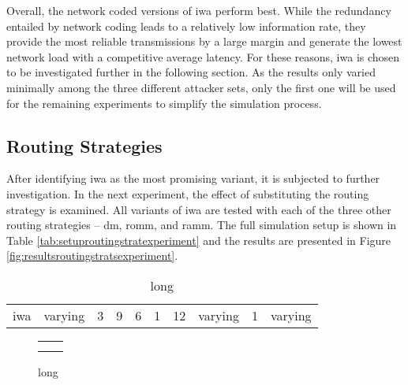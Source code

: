 Overall, the network coded versions of \gls{iwa} perform best. While the redundancy entailed by network coding leads to a relatively low information
rate, they provide the most reliable transmissions by a large margin and generate the lowest network load with a competitive average latency. For
these reasons, \gls{iwa} is chosen to be investigated further in the following section. As the results only varied minimally among the three different
attacker sets, only the first one will be used for the remaining experiments to simplify the simulation process.

\subsection{Routing Strategies}
After identifying \gls{iwa} as the most promising variant, it is subjected to further investigation. In the next experiment, the effect of substituting
the routing strategy is examined. All variants of \gls{iwa} are tested with each of the three other routing strategies -- \gls{dm}, \gls{romm}, and
\gls{ramm}. The full simulation setup is shown in Table \vref{tab:setuproutingstratexperiment} and the results are presented in Figure
\vref{fig:resultsroutingstratsexperiment}.

\begin{table}
    \centering
    \begin{tabulary}{\textwidth}{C|C|C|C|C|C|C|C|C|C}
        \pProtVar{} & \pNCMode{} & \pEncMods{} & \pAuthMods{} & \pRQSize{} & \pARQLimit{} & \pARQTimeout{} & \pRStrat{} & \pAttackerSet{} & \pAttackProb{} \\\hline
        \gls{iwa} & varying & 3 & 9 & 6 & 1 & 12 & varying & 1 & varying \\
    \end{tabulary}
    \caption[Input parameters for routing strategies experiment]{long}
    \label{tab:setuproutingstratexperiment}
\end{table}

\begin{figure}
    \begin{tabular}{cc}
         &  \\
         & 
    \end{tabular}
    \caption[Results for routing strategies experiment]{long}
    \label{fig:resultsroutingstratsexperiment}
\end{figure}

